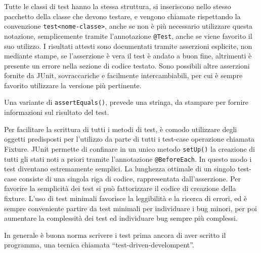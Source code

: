 \documentclass{article}
\numberwithin{equation}{subsection}
\begin{document}
Tutte le classi di test hanno la stessa struttura, si inseriscono nello stesso pacchetto della classe che devono testare, e vengono chiamate rispettando la convenzione 
\verb|test<nome-classe>|, anche se non è più necessario utilizzare questa notazione, semplicemente tramite l'annotazione \verb|@Test|, anche se viene favorito il suo 
utilizzo. I risultati attesti sono documentati tramite asserzioni esplicite, non mediante stampe, se l'asserzione è vera il test è andato a buon fine, altrimenti è 
presente un errore nella sezione di codice testato. Sono possibili altre asserzioni fornite da JUnit, sovraccariche e facilmente intercambiabili, per cui è sempre 
favorito utilizzare la versione più pertinente. 

Una variante di \verb|assertEquals()|, prevede una stringa, da stampare per fornire informazioni sul risultato del test.  


Per facilitare la scrittura di tutti i metodi di test, è comodo utilizzare degli oggetti predisposti per l'utilizzo da parte di tutti i test-case operazione chiamata 
Fixture. JUnit permette di confinare in un unico metodo \verb|setUp()| la creazione di tutti gli stati noti a priori tramite l'annotazione \verb|@BeforeEach|. 
In questo modo i test diventano estremamente semplici. 
La lunghezza ottimale di un singolo test-case consiste di una singola riga di codice, rappresentata dall'asserzione. Per favorire la semplicità dei test si può 
fattorizzare il codice di creazione della fixture. 
L'uso di test minimali favorisce la leggibilità e la ricerca di errori, ed è sempre conveniente partire da test minimali per individuare i bug minori, per poi 
aumentare la complessità dei test ed individuare bug sempre più complessi. 

In generale è buona norma scrivere i test prima ancora di aver scritto il programma, una tecnica chiamata ``test-driven-develompent''. 
\end{document}
